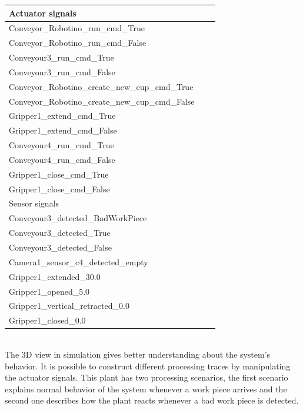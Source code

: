 \begin{bibunit}
\hfill

\begin{tabularx} {0.45\textwidth} { 
   | >{\raggedright\arraybackslash}X 
  | >{\centering\arraybackslash}X 
  | >{\raggedleft\arraybackslash}X | }
 \hline
 
 Actuator signals  \\
 \hline

Conveyor\_Robotino\_run\_cmd\_True \\
Conveyor\_Robotino\_run\_cmd\_False \\
Conveyour3\_run\_cmd\_True \\
Conveyour3\_run\_cmd\_False \\
Conveyor\_Robotino\_create\_new\_cup\_cmd\_True \\
Conveyor\_Robotino\_create\_new\_cup\_cmd\_False \\
Gripper1\_extend\_cmd\_True \\
Gripper1\_extend\_cmd\_False \\
Conveyour4\_run\_cmd\_True \\
Conveyour4\_run\_cmd\_False \\
Gripper1\_close\_cmd\_True \\
Gripper1\_close\_cmd\_False \\

\hline
 Sensor signals  \\
\hline
Conveyour3\_detected\_BadWorkPiece \\
Conveyour3\_detected\_True \\
Conveyour3\_detected\_False \\
Camera1\_sensor\_c4\_detected\_empty \\
Gripper1\_extended\_30.0 \\
Gripper1\_opened\_5.0 \\
Gripper1\_vertical\_retracted\_0.0 \\
Gripper1\_closed\_0.0 \\
\hline


\end{tabularx}
\\

The 3D view in simulation gives better understanding about the system's behavior. It is possible to construct different processing traces by manipulating the  actuator signals. This plant has two processing scenarios, the first scenario explains normal behavior of the system whenever a work piece arrives and the second one describes how the plant reacts whenever a bad work piece is detected.


\end{bibunit}
